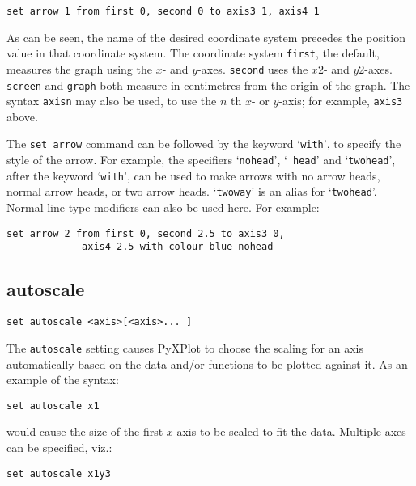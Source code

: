 \begin{verbatim}
set arrow 1 from first 0, second 0 to axis3 1, axis4 1
\end{verbatim}

As can be seen, the name of the desired coordinate system precedes the position
value in that coordinate system. The coordinate system {\tt first}, the default,
measures the graph using the $x$- and $y$-axes. {\tt second} uses the $x2$- and
$y2$-axes.  {\tt screen} and {\tt graph} both measure in centimetres from the
origin of the graph.  The syntax {\tt axisn} may also be
used, to use the $n$ th $x$- or $y$-axis; for example, {\tt axis3} above.

The {\tt set arrow} command can be followed by the keyword `{\tt with}', to
specify the style of the arrow. For example, the specifiers `{\tt nohead}', `{\tt
head}' and `{\tt twohead}', after the keyword `{\tt with}', can be used to make
arrows with no arrow heads, normal arrow heads, or two arrow heads. `{\tt twoway}'
is an alias for `{\tt twohead}'.  Normal line type modifiers can also be used
here.  For example:

\begin{verbatim}
set arrow 2 from first 0, second 2.5 to axis3 0,
             axis4 2.5 with colour blue nohead
\end{verbatim}



\subsection{autoscale}

\begin{verbatim}
set autoscale <axis>[<axis>... ] 
\end{verbatim}

The {\tt autoscale} setting causes PyXPlot to choose the scaling for an axis
automatically based on the data and/or functions to be plotted against it. As
an example of the syntax:

\begin{verbatim}
set autoscale x1
\end{verbatim}

\noindent would cause the size of the first $x$-axis to be scaled to fit the
data.  Multiple axes can be specified, viz.:

\begin{verbatim}
set autoscale x1y3
\end{verbatim}


